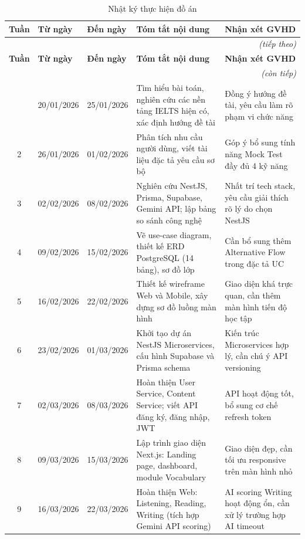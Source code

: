 \documentclass[a4paper,12pt]{extreport}
\begin{document}
\renewcommand{\arraystretch}{1.3}
\begin{longtable}{|c|p{2.0cm}|p{2.0cm}|p{5.0cm}|p{3.0cm}|}
    \caption{Nhật ký thực hiện đồ án}
    \label{tab:nhatky} \\
    \hline
    \textbf{Tuần} & \textbf{Từ ngày} & \textbf{Đến ngày} & \textbf{Tóm tắt nội dung} & \textbf{Nhận xét GVHD} \\ \hline
    \endfirsthead
    \multicolumn{5}{r}{\footnotesize\textit{(tiếp theo)}} \\
    \hline
    \textbf{Tuần} & \textbf{Từ ngày} & \textbf{Đến ngày} & \textbf{Tóm tắt nội dung} & \textbf{Nhận xét GVHD} \\ \hline
    \endhead
    \hline \multicolumn{5}{r}{\footnotesize\textit{(còn tiếp)}} \\
    \endfoot
    \hline
    \endlastfoot
    1 & 20/01/2026 & 25/01/2026 & Tìm hiểu bài toán, nghiên cứu các nền tảng IELTS hiện có, xác định hướng đề tài & Đồng ý hướng đề tài, yêu cầu làm rõ phạm vi chức năng \\ \hline
    2 & 26/01/2026 & 01/02/2026 & Phân tích nhu cầu người dùng, viết tài liệu đặc tả yêu cầu sơ bộ & Góp ý bổ sung tính năng Mock Test đầy đủ 4 kỹ năng \\ \hline
    3 & 02/02/2026 & 08/02/2026 & Nghiên cứu NestJS, Prisma, Supabase, Gemini API; lập bảng so sánh công nghệ & Nhất trí tech stack, yêu cầu giải thích rõ lý do chọn NestJS \\ \hline
    4 & 09/02/2026 & 15/02/2026 & Vẽ use-case diagram, thiết kế ERD PostgreSQL (14 bảng), sơ đồ lớp & Cần bổ sung thêm Alternative Flow trong đặc tả UC \\ \hline
    5 & 16/02/2026 & 22/02/2026 & Thiết kế wireframe Web và Mobile, xây dựng sơ đồ luồng màn hình & Giao diện khá trực quan, cần thêm màn hình tiến độ học tập \\ \hline
    6 & 23/02/2026 & 01/03/2026 & Khởi tạo dự án NestJS Microservices, cấu hình Supabase và Prisma schema & Kiến trúc Microservices hợp lý, cần chú ý API versioning \\ \hline
    7 & 02/03/2026 & 08/03/2026 & Hoàn thiện User Service, Content Service; viết API đăng ký, đăng nhập, JWT & API hoạt động tốt, bổ sung cơ chế refresh token \\ \hline
    8 & 09/03/2026 & 15/03/2026 & Lập trình giao diện Next.js: Landing page, dashboard, module Vocabulary & Giao diện đẹp, cần tối ưu responsive trên màn hình nhỏ \\ \hline
    9 & 16/03/2026 & 22/03/2026 & Hoàn thiện Web: Listening, Reading, Writing (tích hợp Gemini API scoring) & AI scoring Writing hoạt động ổn, cần xử lý trường hợp AI timeout \\ \hline

\end{longtable}
\end{document}
